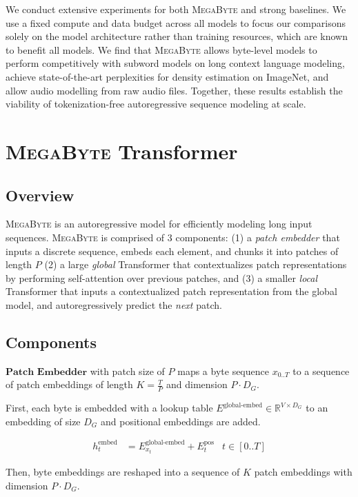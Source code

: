We conduct extensive experiments for both \textsc{MegaByte} and strong baselines. We use a fixed compute and data budget across all models to focus our comparisons solely on the model architecture rather than training resources, which are known to benefit all models. We find that \textsc{MegaByte} allows byte-level models to perform competitively with subword models on long context language modeling, achieve state-of-the-art perplexities for density estimation on ImageNet, and allow audio modelling from raw audio files. Together, these results establish the viability of tokenization-free autoregressive sequence modeling at scale.

\section{\textsc{MegaByte} Transformer}
\subsection{Overview}
\label{sec:fastslow}

\textsc{MegaByte} is an autoregressive model for efficiently modeling long input sequences. \textsc{MegaByte} is comprised of 3 components: (1) a \emph{patch embedder} that inputs a discrete sequence, embeds each element, and chunks it into patches of length $P$ (2) a large \emph{global} Transformer that contextualizes patch representations by performing self-attention over previous patches, and (3) a smaller \emph{local} Transformer that inputs a contextualized patch representation from the global model, and autoregressively predict the \emph{next} patch.

\subsection{Components}
$\textbf{Patch Embedder}$ with patch size of $P$ maps a byte sequence $x_{0..T}$ to a sequence of patch embeddings of length $K=\frac{T}{P}$ and dimension $P\cdot D_G$. 

First, each byte is embedded with a lookup table $E^{\text{global-embed}}\in\mathbb{R}^{V \times D_G}$ to an embedding of size $D_G$ and positional embeddings are added.

\begin{align}
h^\text{embed}_{t}&= E^\text{global-embed}_{x_t}+E^\text{pos}_t & t\in [0..T]
\end{align}

Then, byte embeddings are reshaped into a sequence of $K$ patch embeddings with dimension $P\cdot D_G$.

